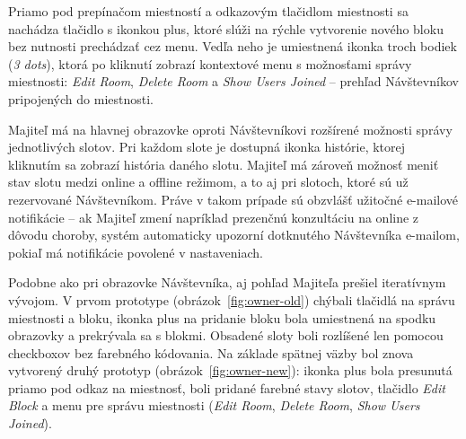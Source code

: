Priamo pod prepínačom miestností a odkazovým tlačidlom miestnosti sa nachádza tlačidlo 
s ikonkou plus, ktoré slúži na rýchle vytvorenie nového bloku bez nutnosti prechádzať 
cez menu. Vedľa neho je umiestnená ikonka troch bodiek (\textit{3 dots}), ktorá po 
kliknutí zobrazí kontextové menu s možnosťami správy miestnosti: \textit{Edit Room}, 
\textit{Delete Room} a \textit{Show Users Joined} – prehľad Návštevníkov pripojených do miestnosti.

Majiteľ má na hlavnej obrazovke oproti Návštevníkovi rozšírené možnosti správy 
jednotlivých slotov. Pri každom slote je dostupná ikonka histórie, ktorej kliknutím 
sa zobrazí história daného slotu. Majiteľ má zároveň možnosť meniť stav slotu medzi 
online a offline režimom, a to aj pri slotoch, ktoré sú už rezervované Návštevníkom. 
Práve v takom prípade sú obzvlášť užitočné e-mailové notifikácie – ak Majiteľ zmení 
napríklad prezenčnú konzultáciu na online z dôvodu choroby, systém automaticky upozorní 
dotknutého Návštevníka e-mailom, pokiaľ má notifikácie povolené v nastaveniach.

Podobne ako pri obrazovke Návštevníka, aj pohľad Majiteľa prešiel iteratívnym vývojom. V prvom prototype (obrázok~\ref{fig:owner-old}) chýbali tlačidlá na správu miestnosti a bloku, ikonka plus na pridanie bloku bola umiestnená na spodku obrazovky a prekrývala sa s blokmi. Obsadené sloty boli rozlíšené len pomocou checkboxov bez farebného kódovania. Na základe spätnej väzby bol znova vytvorený druhý prototyp (obrázok~\ref{fig:owner-new}): ikonka plus bola presunutá priamo pod odkaz na miestnosť, boli pridané farebné stavy slotov, tlačidlo \textit{Edit Block} a menu pre správu miestnosti (\textit{Edit Room}, \textit{Delete Room}, \textit{Show Users Joined}).

